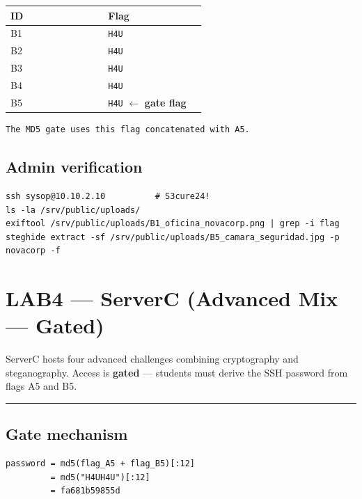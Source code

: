 {\footnotesize\begin{longtable}[]{@{}>{\raggedright\arraybackslash}p{0.45\linewidth}
  >{\raggedright\arraybackslash}p{0.45\linewidth}@{}}
\toprule\noalign{}
ID & Flag \\
\midrule\noalign{}
\endhead
\bottomrule\noalign{}
\endlastfoot
B1 & \texttt{H4U} \\
B2 & \texttt{H4U} \\
B3 & \texttt{H4U} \\
B4 & \texttt{H4U} \\
B5 & \texttt{H4U} $\leftarrow$ \textbf{gate flag} \\
\end{longtable}}

\begin{lstlisting}
The MD5 gate uses this flag concatenated with A5.
\end{lstlisting}

\subsection{Admin verification}

\begin{lstlisting}
ssh sysop@10.10.2.10          # S3cure24!
ls -la /srv/public/uploads/
exiftool /srv/public/uploads/B1_oficina_novacorp.png | grep -i flag
steghide extract -sf /srv/public/uploads/B5_camara_seguridad.jpg -p novacorp -f
\end{lstlisting}

\section{LAB4 --- ServerC (Advanced Mix --- Gated)}

ServerC hosts four advanced challenges combining cryptography and steganography. Access is \textbf{gated} --- students must derive the SSH password from flags A5 and B5.

\begin{center}\rule{0.5\linewidth}{0.5pt}\end{center}

\subsection{Gate mechanism}

\begin{lstlisting}
password = md5(flag_A5 + flag_B5)[:12]
         = md5("H4UH4U")[:12]
         = fa681b59855d
\end{lstlisting}

